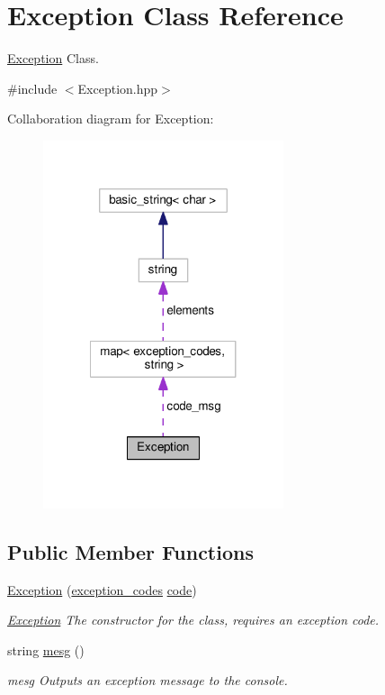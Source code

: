 \hypertarget{class_exception}{\section{Exception Class Reference}
\label{class_exception}
}


\hyperlink{class_exception}{Exception} Class.  




{\ttfamily \#include $<$Exception.\-hpp$>$}



Collaboration diagram for Exception\-:
\nopagebreak
\begin{figure}[H]
\begin{center}
\leavevmode
\includegraphics[width=200pt]{class_exception__coll__graph}
\end{center}
\end{figure}
\subsection*{Public Member Functions}
\begin{DoxyCompactItemize}
\item 
\hyperlink{class_exception_a8399a723aeecd6605a083ca6ad0ba5ee}{Exception} (\hyperlink{_exception_8hpp_a7913b361832b19772aa960f7caa626dd}{exception\-\_\-codes} \hyperlink{class_exception_a9aa58ee0368fb1bfbc2335e3f4114aee}{code})
\begin{DoxyCompactList}\small\item\em \hyperlink{class_exception}{Exception} The constructor for the class, requires an exception code. \end{DoxyCompactList}\item 
string \hyperlink{class_exception_a2fcdf81ddb36b0c8700d4983620976e7}{mesg} ()
\begin{DoxyCompactList}\small\item\em mesg Outputs an exception message to the console. \end{DoxyCompactList}\end{DoxyCompactItemize}
